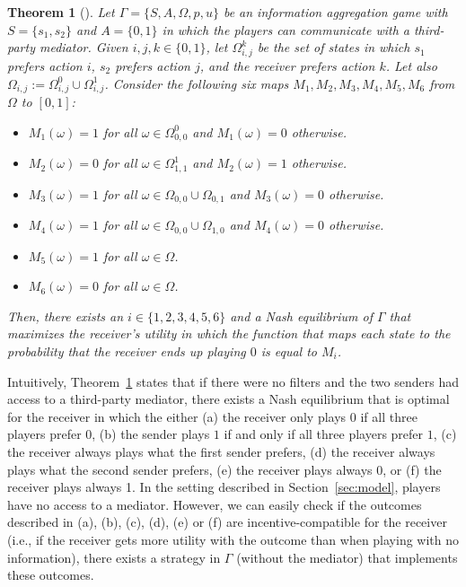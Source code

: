 \documentclass[submission,copyright,creativecommons]{eptcs}
\newtheorem{theorem}{Theorem}
\begin{document}
\begin{theorem}[\cite{arieli2023mediated}]\label{thm:mediator}
Let $\Gamma = \{S, A, \Omega, p, u\}$ be an information aggregation game with $S = \{s_1, s_2\}$ and $A = \{0,1\}$ in which the players can communicate with a third-party mediator. Given $i,j,k \in \{0,1\}$, let $\Omega_{i,j}^k$ be the set of states in which $s_1$ prefers action $i$, $s_2$ prefers action $j$, and the receiver prefers action $k$. Let also $\Omega_{i,j} := \Omega_{i,j}^0 \cup \Omega_{i,j}^1$. Consider the following six maps $M_1, M_2, M_3, M_4, M_5, M_6$ from $\Omega$ to $[0,1]$:

\begin{itemize}
    \item [(a)] $M_1(\omega) = 1$ for all $\omega \in \Omega_{0,0}^0$ and $M_1(\omega) = 0$ otherwise.
    \item [(b)] $M_2(\omega) = 0$ for all $\omega \in \Omega_{1,1}^1$ and $M_2(\omega) = 1$ otherwise.
    \item [(c)] $M_3(\omega) = 1$ for all $\omega \in \Omega_{0,0} \cup \Omega_{0,1}$ and $M_3(\omega) = 0$ otherwise.
    \item [(d)] $M_4(\omega) = 1$ for all $\omega \in \Omega_{0,0} \cup \Omega_{1,0}$ and $M_4(\omega) = 0$ otherwise.
    \item [(e)] $M_5(\omega) = 1$ for all $\omega \in \Omega$.
    \item [(f)] $M_6(\omega) = 0$ for all $\omega \in \Omega$.
\end{itemize}

Then, there exists an $i \in \{1,2,3,4,5,6\}$ and a Nash equilibrium of $\Gamma$ that maximizes the receiver's utility in which the function that maps each state to the probability that the receiver ends up playing $0$ is equal to $M_i$.
\end{theorem}

Intuitively, Theorem~\ref{thm:mediator} states that if there were no filters and the two senders had access to a third-party mediator, there exists a Nash equilibrium that is optimal for the receiver in which the either (a) the receiver only plays $0$ if all three players prefer $0$, (b) the sender plays $1$ if and only if all three players prefer $1$, (c) the receiver always plays what the first sender prefers, (d) the receiver always plays what the second sender prefers, (e) the receiver plays always 0, or (f) the receiver plays always 1. In the setting described in Section~\ref{sec:model}, players have no access to a mediator. However, we can easily check if the outcomes described in (a), (b), (c), (d), (e) or (f) are incentive-compatible for the receiver (i.e., if the receiver gets more utility with the outcome than when playing with no information), there exists a strategy in $\Gamma$ (without the mediator) that implements these outcomes.
\end{document}
